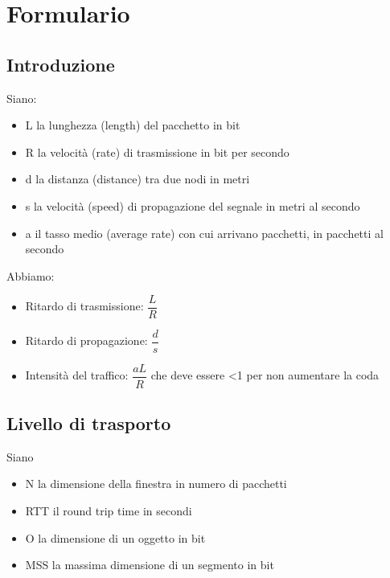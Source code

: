 \documentclass[11pt,a4paper]{article}
\begin{document}
\section{Formulario}
\subsection{Introduzione}
Siano:
\begin{itemize}
	\item L la lunghezza (length) del pacchetto in bit
	\item R la velocità (rate) di trasmissione in bit per secondo
	\item d la distanza (distance) tra due nodi in metri
	\item s la velocità (speed) di propagazione del segnale in metri al secondo
	\item a il tasso medio (average rate) con cui arrivano pacchetti, in pacchetti al secondo
\end{itemize}

Abbiamo:
\begin{itemize}
	\item Ritardo di trasmissione: $\dfrac{L}{R}$
	\item Ritardo di propagazione: $\dfrac{d}{s}$
	\item Intensità del traffico: $\dfrac{aL}{R}$ che deve essere <1 per non aumentare la coda
\end{itemize}

\subsection{Livello di trasporto}
Siano
\begin{itemize}
	\item N la dimensione della finestra in numero di pacchetti
	\item RTT il round trip time in secondi
	\item O la dimensione di un oggetto in bit
	\item MSS la massima dimensione di un segmento in bit
\end{itemize}
\end{document}
